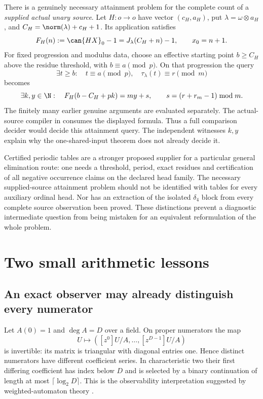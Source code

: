 \documentclass[11pt,a4paper]{article}
\begin{document}
There is a genuinely necessary attainment problem for the complete count
of a \emph{supplied actual unary source}.  Let
$H:o\to o$ have vector $(c_H,a_H)$, put $\lambda=\omega\otimes a_H$,
and $C_H=\norm(\lambda)+c_H+1$.  Its application satisfies
\[
 F_H(n):=\can{HX}_0-1=J_\lambda(C_H+n)-1,
 \qquad x_0=n+1.
\]
For fixed progression and modulus data, choose an effective starting point
$b\ge C_H$ above the residue threshold, with $b\equiv a\pmod p$.
On that progression the query
\[
 \exists t\ge b:\quad t\equiv a\pmod p,\quad
                 \tau_\lambda(t)\equiv r\pmod m
\]
becomes
\[
 \exists k,y\in\N:\quad F_H(b-C_H+pk)=my+s,
 \qquad s=(r+r_m-1)\bmod m.
\]
The finitely many earlier genuine arguments are evaluated separately.
The actual-source compiler in \cite{wwexpressivity} consumes the displayed
formula.  Thus a full comparison decider would decide this attainment query.
The independent witnesses $k,y$ explain why the one-shared-input theorem
does not already decide it.

Certified periodic tables are a stronger proposed supplier for a particular
general elimination route: one needs a threshold, period, exact residues and
certification of all negative occurrence claims on the declared head family.
The necessary supplied-source attainment problem should not be identified
with tables for every auxiliary ordinal head.  Nor has an extraction of the
isolated $\delta_4$ block from every complete source observation been proved.
These distinctions prevent a diagnostic intermediate question from being
mistaken for an equivalent reformulation of the whole problem.

\section{Two small arithmetic lessons}\label{sec:lessons}

\subsection{An exact observer may already distinguish every numerator}
Let $A(0)=1$ and $\deg A=D$ over a field.  On proper numerators the map
\[
 U\longmapsto([z^0]U/A,\ldots,[z^{D-1}]U/A)
\]
is invertible: its matrix is triangular with diagonal entries one.  Hence
distinct numerators have different coefficient series.  In characteristic
two their first differing coefficient has index below $D$ and is selected
by a binary continuation of length at most $\lceil\log_2D\rceil$.
This is the observability interpretation suggested by weighted-automaton
theory \cite{kiefer}.
\end{document}

